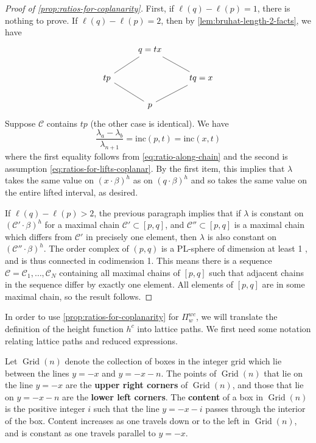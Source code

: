 \documentclass[11pt]{amsart}
\theoremstyle{definition}
\DeclareMathOperator{\Grid}{Grid}
\newcommand{\mcc}{\mathcal{C}}
\newcommand\defn[1]{{\bf #1}}
\def\lin{\lambda}
\def\hgt{h}
\def\hc{\hgt^c}
\def\grid_#1{\Grid(#1)}
\def\pt{\beta}
\def\steep{{\mathrm {inc}}}
\begin{document}
\begin{proof}[Proof of \cref{prop:ratios-for-coplanarity}]
	First, if $\ell(q)-\ell(p)=1$, there is nothing to prove. If $\ell(q)-\ell(p)=2$, then by \cref{lem:bruhat-length-2-facts}, we have 
			\[\begin{tikzcd}
		& {q}=tx \\
		{tp} && {tq}=x \\
		& p
		\arrow[no head, from=1-2, to=2-3]
		\arrow[no head, from=2-1, to=1-2]
		\arrow[no head, from=2-3, to=3-2]
		\arrow[no head, from=3-2, to=2-1]
	\end{tikzcd}\]
	Suppose $\mcc$ contains $tp$ (the other case is identical). We have
		\[\frac{\lin_a - \lin_b}{\lin_{n+1}} = \steep(p, t)=\steep(x,t)\]
		where the first equality follows from \eqref{eq:ratio-along-chain} and the second is assumption \eqref{eq:ratios-for-lifts-coplanar}. By the first item, this implies that $\lin$ takes the same value on $(x \cdot \pt)^\hgt$ as on $(q \cdot \pt)^\hgt$ and so takes the same value on the entire lifted interval, as desired.
	
	If $\ell(q)-\ell(p)>2$, the previous paragraph implies that if $\lin$ is constant on $(\mcc' \cdot \pt)^\hgt$ for a maximal chain $\mcc' \subset [p,q]$, and $\mcc'' \subset [p,q]$ is a maximal chain which differs from $\mcc'$ in precisely one element, then $\lin$ is also constant on $(\mcc'' \cdot \pt)^\hgt$. The order complex of $(p,q)$ is a PL-sphere of dimension at least 1 \cite{BW82}, and is thus connected in codimension 1. This means there is a sequence $\mcc=\mcc_1, \dots, \mcc_N$ containing all maximal chains of $[p,q]$ such that adjacent chains in the sequence differ by exactly one element. All elements of $[p,q]$ are in some maximal chain, so the result follows.
\end{proof}



In order to use \cref{prop:ratios-for-coplanarity} for $\Pi_w^{wc}$, we will translate the definition of the height function $\hc$ into lattice paths. We first need some notation relating lattice paths and reduced expressions.


Let $\grid_n$ denote the collection of boxes in the integer grid which lie between the lines $y=-x$ and $y=-x-n$. The points of $\grid_{n}$ that lie on the line $y=-x$ are the \defn{upper right corners} of $\grid_n$, and those that lie on $y=-x-n$ are the \defn{lower left corners}. The \defn{content} of a box in $\grid_n$ is the positive integer $i$ such that the line $y=-x-i$ passes through the interior of the box.
Content increases as one travels down or to the left in $\grid_n$, and is constant as one travels parallel to $y=-x$.
\end{document}
